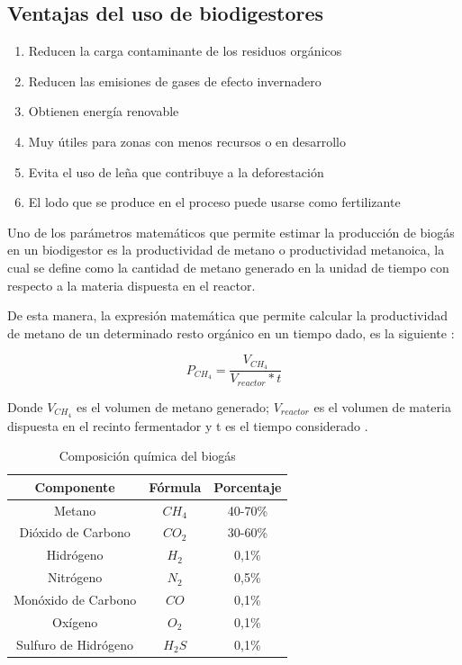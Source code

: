 \documentclass[a4paper,10pt]{article}
\begin{document}
\subsection{Ventajas del uso de biodigestores}
\begin{enumerate}
\item Reducen la carga contaminante de los residuos orgánicos 
\item Reducen las emisiones de gases de efecto invernadero 
\item Obtienen energía renovable
\item Muy útiles para zonas con menos recursos o en desarrollo
\item Evita el uso de leña que contribuye a la deforestación
\item El lodo que se produce en el proceso puede usarse como fertilizante
\end{enumerate}

Uno de los parámetros matemáticos que permite estimar la producción de biogás en un biodigestor es la productividad de metano o productividad metanoica, la cual se define como la cantidad de metano generado en la unidad de tiempo con respecto a la materia dispuesta en el reactor. 

De esta manera, la expresión matemática que permite calcular la productividad de metano de un determinado resto orgánico en un tiempo dado, es la siguiente \cite{Sogari2003}:

\begin{displaymath}
P_{CH_{4}}=\frac{V_{CH_{4}}}{V_{reactor}*t}
\end{displaymath}

Donde $V_{CH_{4}}$ es el volumen de metano generado; $V_{reactor}$ es el volumen de materia dispuesta en el recinto fermentador y t es el tiempo considerado \cite{Sogari2003}.

\begin{table}[H]
\centering
\begin{tabular}{|c|c|c|}
\hline
\rowcolor{gray!50}
{\bf Componente} & {\bf Fórmula} & {\bf Porcentaje} \\ 
\hline
\hline
Metano & ${CH_{4}}$ & 40-70\% \\
\hline
Dióxido de Carbono & ${CO_{2}}$ & 30-60\% \\
\hline
Hidrógeno & ${H_{2}}$ & 0,1\% \\
\hline
Nitrógeno & ${N_{2}}$ & 0,5\% \\
\hline
Monóxido de Carbono & $CO$ & 0,1\% \\
\hline
Oxígeno & ${O_{2}}$ & 0,1\% \\
\hline
Sulfuro de Hidrógeno & ${H_{2}S}$ & 0,1\% \\
\hline
\end{tabular}
\caption{Composición química del biogás \cite{Blanco2013}}
\label{Tabla 2}
\end{table}
\end{document}
